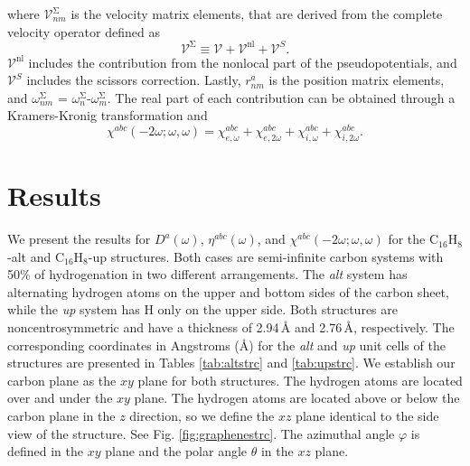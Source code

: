 \documentclass[pss]{wiley2sp} %
\begin{document}
where $\mathcal{V}^{\mathrm{\Sigma}}_{nm}$ is the velocity matrix elements,
that are derived from the complete velocity operator defined as
\begin{equation*}\label{eq:nonlocal}
\boldsymbol{\mathcal{V}}^{\mathrm{\Sigma}}\equiv
\boldsymbol{\mathcal{V}}+
\boldsymbol{\mathcal{V}}^{\mathrm{nl}}+
\boldsymbol{\mathcal{V}}^{S}.
\end{equation*}
$\boldsymbol{\mathcal{V}}^{\mathrm{nl}}$ includes the contribution from the
nonlocal part of the pseudopotentials, and $\boldsymbol{\mathcal{V}}^{S}$
includes the scissors correction. Lastly, $r^{a}_{nm}$ is the position matrix
elements, and $\omega^\mathrm{\Sigma}_{nm}$ =
$\omega^{\mathrm{\Sigma}}_{n}$-$\omega^{\mathrm{\Sigma}}_{m}$. The real part
of each contribution can be obtained through a Kramers-Kronig transformation
\cite{tancognePRB14} and
\begin{equation}\label{eq:chitotal}
\chi^{abc} (-2\omega;\omega,\omega) =
\chi^{abc}_{e,\omega} + \chi^{abc}_{e,2\omega} +
\chi^{abc}_{i,\omega} + \chi^{abc}_{i,2\omega}.
\end{equation}


\section{Results}\label{sec:results}

We present the results for {$D^{a}(\omega)$}, {$\eta^{abc}(\omega)$}, and
$\chi^{abc}(-2\omega;\omega,\omega)$ for the C$_{16}$H$_{8}$-alt and
C$_{16}$H$_{8}$-up structures. Both cases are semi-infinite carbon systems
with 50\% of hydrogenation in two different arrangements. The \emph{alt}
system has alternating hydrogen atoms on the upper and bottom sides of the
carbon sheet, while the \emph{up} system has H only on the upper side. Both
structures are noncentrosymmetric and have a thickness of 2.94\,{\AA} and
2.76\,{\AA}, respectively. The corresponding coordinates in Angstroms (\AA)
for the \emph{alt} and \emph{up} unit cells of the structures are presented in
Tables \ref{tab:altstrc} and \ref{tab:upstrc}. We establish our carbon plane
as the $xy$ plane for both structures. The hydrogen atoms are located over and
under the $xy$ plane. The hydrogen atoms are located above or below the carbon
plane in the $z$ direction, so we define the $xz$ plane identical to the side
view of the structure. See Fig. \ref{fig:graphenestrc}. The azimuthal angle
$\varphi$ is defined in the $xy$ plane and the polar angle $\theta$ in the
$xz$ plane.
\end{document}
